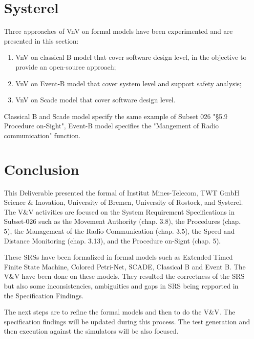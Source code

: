 \documentclass{template/openetcs_article}
\begin{document}
\section{Systerel}

Three approaches of VnV  on formal models have been experimented and are
presented in this section:

\begin{enumerate}
\item VnV on classical B  model that cover software design level, in the objective to provide an open-source approach;
\item VnV on Event-B model that cover system level and support safety analysis;
\item VnV on Scade model that cover software design level.
\end{enumerate}

Classical B and Scade model specify the same example of Subset 026 "§5.9
Procedure on-Sight", Event-B model specifies the "Mangement of Radio
communication" function.








\section{Conclusion}

This Deliverable presented the formal \vv of Institut
Mines-Telecom, TWT GmbH Science \& Inovation, University of Bremen, University of Rostock, and
Systerel.
The V\&V activities are focused on the System Requirement Specifications in
Subset-026 such as the Movement Authority (chap. 3.8), the Procedures (chap. 5),
the Management of the Radio Communication (chap. 3.5), the Speed and Distance
Monitoring (chap. 3.13), and the Procedure on-Signt (chap. 5).

These SRSs have been formalized in formal models such as  Extended Timed Finite
State Machine, Colored Petri-Net, SCADE, Classical B and Event B.
The V\&V have been done on these models. They resulted
the correctness of the SRS but also
some inconsistencies, ambiguities and gaps in SRS being
repported in the Specification Findings.

The next steps are to refine the formal models and then to do the V\&V.
The specification findings will be updated during this process.
The test generation and then execution against the
simulators will be also focused.





%



%
\end{document}
